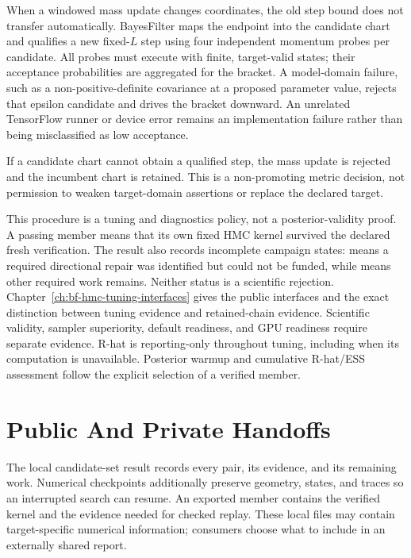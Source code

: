 When a windowed mass update changes coordinates, the old step bound does not
transfer automatically.  BayesFilter maps the endpoint into the candidate
chart and qualifies a new fixed-\(L\) step using four independent momentum
probes per candidate.  All probes must execute with finite, target-valid
states; their acceptance probabilities are aggregated for the bracket.  A
model-domain failure, such as a non-positive-definite covariance at a proposed
parameter value, rejects that epsilon candidate and drives the bracket
downward.  An unrelated TensorFlow runner or device error remains an
implementation failure rather than being misclassified as low acceptance.

If a candidate chart cannot obtain a qualified step, the mass update is
rejected and the incumbent chart is retained.  This is a non-promoting metric
decision, not permission to weaken target-domain assertions or replace the
declared target.

This procedure is a tuning and diagnostics policy, not a posterior-validity
proof.  A passing member means that its own fixed HMC kernel survived the
declared fresh verification.  The result also records incomplete campaign
states:  means a required directional repair
was identified but could not be funded, while  means
other required work remains.  Neither status is a scientific rejection.
Chapter~\ref{ch:bf-hmc-tuning-interfaces} gives the public interfaces and the
exact distinction between tuning evidence and retained-chain evidence.
Scientific validity, sampler superiority, default readiness, and GPU readiness
require separate evidence.
R-hat is reporting-only throughout tuning, including when its computation is
unavailable. Posterior warmup and cumulative R-hat/ESS assessment follow the
explicit selection of a verified member.

\section{Public And Private Handoffs}
\label{sec:bf-hmc-public-private-handoffs}

The local candidate-set result records every pair, its evidence, and its
remaining work. Numerical checkpoints additionally preserve geometry, states,
and traces so an interrupted search can resume. An exported member contains
the verified kernel and the evidence needed for checked replay. These local
files may contain target-specific numerical information; consumers choose what
to include in an externally shared report.

